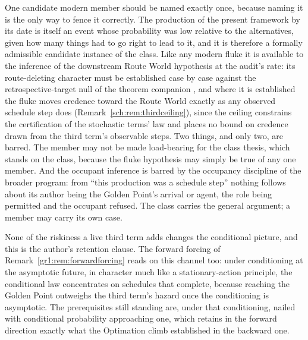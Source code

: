 \begin{remark}
One candidate modern member should be named exactly once, because
naming it is the only way to fence it correctly. The production of
the present framework by its date is itself an event whose
probability was low relative to the alternatives, given how many
things had to go right to lead to it, and it is therefore a formally
admissible candidate instance of the class. Like any modern fluke it
is available to the inference of the downstream Route World hypothesis at
the audit's rate: its route-deleting character must be established
case by case against the retrospective-target null of
the theorem companion \cite{GoldenTargeted}, and where it is established the
fluke moves credence toward the Route World exactly as any observed
schedule step does (Remark~\ref{sch:rem:thirdceiling}), since the
ceiling constrains the certification of the stochastic terms' law and
places no bound on credence drawn from the third term's observable
steps. Two things, and only two, are barred. The member may not be
made load-bearing for the class thesis, which stands on the class,
because the fluke hypothesis may simply be true of any one member.
And the occupant inference is barred by
the occupancy discipline of the broader program: from ``this production was a
schedule step'' nothing follows about its author being the Golden
Point's arrival or agent, the role being permitted and the occupant
refused. The class carries the general argument; a member may carry
its own case.

None of the riskiness a live third term adds changes the conditional
picture, and this is the author's retention clause. The forward
forcing of Remark~\ref{gr1:rem:forwardforcing} reads on this channel
too: under conditioning at the asymptotic future, in character much
like a stationary-action principle, the conditional law concentrates
on schedules that complete, because reaching the Golden Point
outweighs the third term's hazard once the conditioning is
asymptotic. The prerequisites still standing are, under that
conditioning, nailed with conditional probability approaching one,
which retains in the forward direction exactly what the Optimation
climb established in the backward one.
\end{remark}

